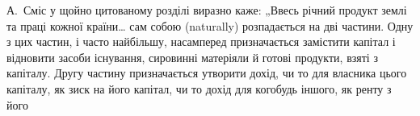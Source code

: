 А.~Сміс у щойно цитованому розділі виразно каже: „Ввесь річний
продукт землі та праці кожної країни\dots{} сам собою (naturally) розпадається
на дві частини. Одну з цих частин, і часто найбільшу, насамперед
призначається замістити капітал і відновити засоби існування, сировинні
матеріяли й готові продукти, взяті з капіталу. Другу частину призначається
утворити дохід, чи то для власника цього капіталу, як зиск на
його капітал, чи то дохід для когобудь іншого, як ренту з його
\parbreak{}  %
